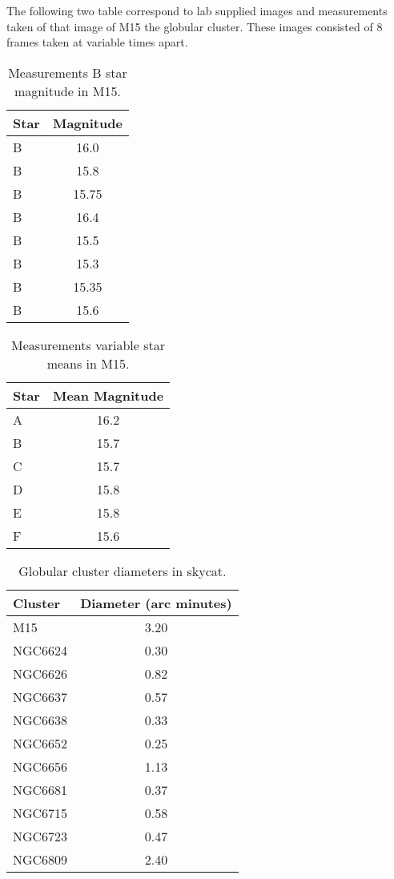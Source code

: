 \documentclass{article}
\begin{document}
The following two table correspond to lab supplied images and measurements taken
of that image of M15 the globular cluster. These images consisted of 8 frames taken
at variable times apart.

\begin{table}[H]
\begin{center}
\begin{tabular}{l c}
\hline
Star & Magnitude\\
\hline
\hline
B & 16.0\\
B & 15.8\\
B & 15.75\\
B & 16.4\\
B & 15.5\\
B & 15.3\\
B & 15.35\\
B & 15.6\\
\hline
\end{tabular}
\end{center}
\caption{Measurements B star magnitude in M15.\label{tab:m15}}
\end{table}

\begin{table}[H]
\begin{center}
\begin{tabular}{l c}
\hline
Star & Mean Magnitude\\
\hline
\hline
A & 16.2\\
B & 15.7\\
C & 15.7\\
D & 15.8\\
E & 15.8\\
F & 15.6\\
\hline
\end{tabular}
\end{center}
\caption{Measurements variable star means in M15.\label{tab:mean}}
\end{table}

\begin{table}[H]
\begin{center}
\begin{tabular}{l c}
\hline
Cluster & Diameter (arc minutes)\\
\hline
\hline
M15 & 3.20\\
NGC6624 & 0.30\\
NGC6626 & 0.82\\
NGC6637 & 0.57\\
NGC6638 & 0.33\\
NGC6652 & 0.25\\
NGC6656 & 1.13\\
NGC6681 & 0.37\\
NGC6715 & 0.58\\
NGC6723 & 0.47\\
NGC6809 & 2.40\\
\hline
\end{tabular}
\end{center}
\caption{Globular cluster diameters in skycat.\label{tab:size}}
\end{table}
\end{document}
